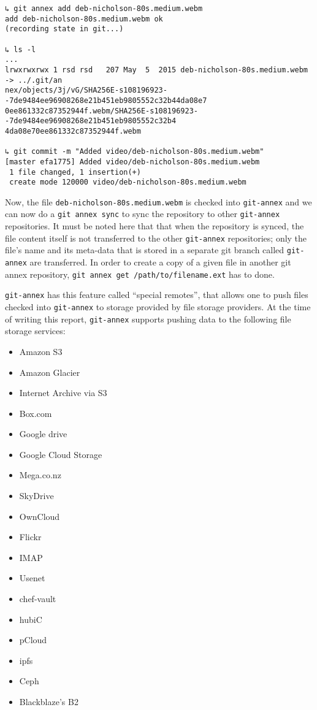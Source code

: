 {\small
\begin{verbatim}
↳ git annex add deb-nicholson-80s.medium.webm
add deb-nicholson-80s.medium.webm ok
(recording state in git...)

↳ ls -l
...
lrwxrwxrwx 1 rsd rsd   207 May  5  2015 deb-nicholson-80s.medium.webm -> ../.git/an
nex/objects/3j/vG/SHA256E-s108196923--7de9484ee96908268e21b451eb9805552c32b44da08e7
0ee861332c87352944f.webm/SHA256E-s108196923--7de9484ee96908268e21b451eb9805552c32b4
4da08e70ee861332c87352944f.webm

↳ git commit -m "Added video/deb-nicholson-80s.medium.webm"
[master efa1775] Added video/deb-nicholson-80s.medium.webm
 1 file changed, 1 insertion(+)
 create mode 120000 video/deb-nicholson-80s.medium.webm
\end{verbatim}
}

Now, the file \verb+deb-nicholson-80s.medium.webm+ is checked into
\verb+git-annex+ and we can now do a \verb+git annex sync+ to sync the
repository to other \verb+git-annex+ repositories. It must be noted
here that that when the repository is synced, the file content itself
is not transferred to the other \verb+git-annex+ repositories; only
the file's name and its meta-data that is stored in a separate git
branch called \verb+git-annex+ are
transferred\cite{documentation:git-annex-hworks}. In order to create a
copy of a given file in another git annex repository,
\verb+git annex get /path/to/filename.ext+ has to done.

\verb+git-annex+ has this feature called ``special
remotes''\cite{documentation:git-annex-sremotes}, that allows one to
push files checked into \verb+git-annex+ to storage provided by file
storage providers. At the time of writing this report,
\verb+git-annex+ supports pushing data to the following file storage
services:

{\scriptsize
\begin{itemize}
\item Amazon S3
\item Amazon Glacier
\item Internet Archive via S3
\item Box.com
\item Google drive
\item Google Cloud Storage
\item Mega.co.nz
\item SkyDrive
\item OwnCloud
\item Flickr
\item IMAP
\item Usenet
\item chef-vault
\item hubiC
\item pCloud
\item ipfs
\item Ceph
\item Blackblaze's B2
\end{itemize}
}

